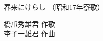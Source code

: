 \documentclass[10pt,b5j]{tarticle} %
\begin{document}
\begin{minipage}[c]{0.7\hsize} %
    \begin{center}
        {\LARGE
            春来にけらし %
        }
        {\small 
            （昭和17年寮歌） %
        }
    \end{center}
\end{minipage}
\begin{minipage}[c]{0.3\hsize} %
    \begin{flushright} %
        橋爪秀雄君 作歌\\杢子一雄君 作曲 %
    \end{flushright}
\end{minipage}
\end{document}

